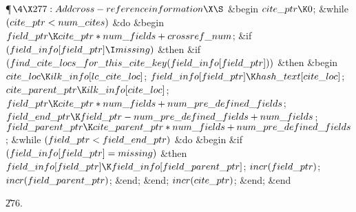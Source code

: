 \Y\P$\4\X277:Add cross-reference information\X\S$\6
\&{begin} $\\{cite\_ptr}\K0$;\6
\&{while} $(\\{cite\_ptr}<\\{num\_cites})$ \1\&{do}\6
\&{begin} $\\{field\_ptr}\K\\{cite\_ptr}\ast\\{num\_fields}+\\{crossref%
\_num}$;\6
\&{if} $(\\{field\_info}[\\{field\_ptr}]\I\\{missing})$ \1\&{then}\6
\&{if} $(\\{find\_cite\_locs\_for\_this\_cite\_key}(\\{field\_info}[\\{field%
\_ptr}]))$ \1\&{then}\6
\&{begin} $\\{cite\_loc}\K\\{ilk\_info}[\\{lc\_cite\_loc}]$;\5
$\\{field\_info}[\\{field\_ptr}]\K\\{hash\_text}[\\{cite\_loc}]$;\5
$\\{cite\_parent\_ptr}\K\\{ilk\_info}[\\{cite\_loc}]$;\5
$\\{field\_ptr}\K\\{cite\_ptr}\ast\\{num\_fields}+\\{num\_pre\_defined%
\_fields}$;\5
$\\{field\_end\_ptr}\K\\{field\_ptr}-\\{num\_pre\_defined\_fields}+\\{num%
\_fields}$;\5
$\\{field\_parent\_ptr}\K\\{cite\_parent\_ptr}\ast\\{num\_fields}+\\{num\_pre%
\_defined\_fields}$;\6
\&{while} $(\\{field\_ptr}<\\{field\_end\_ptr})$ \1\&{do}\6
\&{begin} \&{if} $(\\{field\_info}[\\{field\_ptr}]=\\{missing})$ \1\&{then}\5
$\\{field\_info}[\\{field\_ptr}]\K\\{field\_info}[\\{field\_parent\_ptr}]$;\2\6
$\\{incr}(\\{field\_ptr})$;\5
$\\{incr}(\\{field\_parent\_ptr})$;\6
\&{end};\2\6
\&{end};\2\2\6
$\\{incr}(\\{cite\_ptr})$;\6
\&{end};\2\6
\&{end}\par
\U276.\fi

